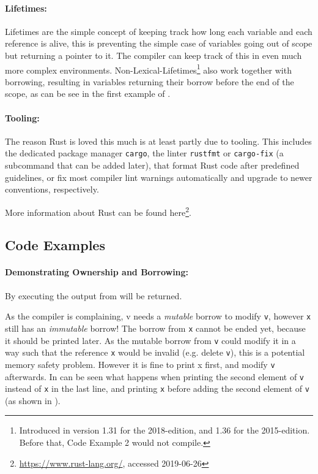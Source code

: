 \paragraph{Lifetimes:}\label{sec:lifetimes}
Lifetimes are the simple concept of keeping track how long each variable and
each reference is alive, this is preventing the simple case of variables
going out of scope but returning a pointer to it. The compiler can keep track
of this in even much more complex environments.
Non-Lexical-Lifetimes\footnote{Introduced in version 1.31 for the 2018-edition,
and 1.36 for the 2015-edition. Before that, Code Example 2 would not compile.}
also work together with borrowing, resulting in variables returning their
borrow before the end of the scope, as can be see in the first example of
.

\paragraph{Tooling:}\label{sec:tools}

The reason Rust is loved \cite{rustloved} this much is at least partly due to
tooling. This includes the dedicated package manager \verb|cargo|, the linter
\verb|rustfmt| or \verb|cargo-fix| (a subcommand that can be added later), that
format Rust code after predefined guidelines, or fix most compiler lint warnings
automatically and upgrade to newer conventions, respectively.

More information about Rust can be found
here\footnote{\url{https://www.rust-lang.org/}, accessed 2019-06-26}.




\newpage
\subsection{Code Examples}\label{sec:examples}

\paragraph{Demonstrating Ownership and Borrowing:}

By executing  the output from  will be returned.



As the compiler is complaining, v needs a {\em mutable} borrow to modify
\verb|v|, however \verb|x| still has an {\em immutable} borrow! The borrow from
\verb|x| cannot be ended yet, because it should be printed later. As the mutable
borrow from \verb|v| could modify it in a way such that the reference \verb|x|
would be invalid (e.g. delete \verb|v|), this is a potential memory safety problem.
However it is fine to print x first, and modify \verb|v| afterwards. In
 can be seen what happens when printing the second element of
\verb|v| instead of \verb|x| in the last line, and printing \verb|x| before
adding the second element of \verb|v| (as shown in ).

